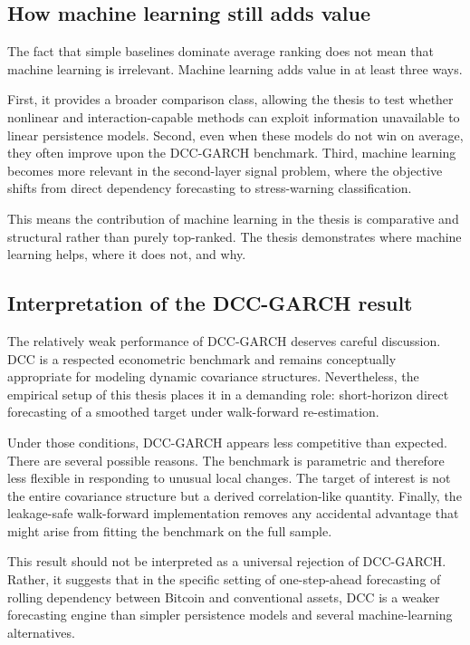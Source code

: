 \subsection{How machine learning still adds value}

The fact that simple baselines dominate average ranking does not mean that machine learning is irrelevant. Machine learning adds value in at least three ways.

First, it provides a broader comparison class, allowing the thesis to test whether nonlinear and interaction-capable methods can exploit information unavailable to linear persistence models. Second, even when these models do not win on average, they often improve upon the DCC-GARCH benchmark. Third, machine learning becomes more relevant in the second-layer signal problem, where the objective shifts from direct dependency forecasting to stress-warning classification.

This means the contribution of machine learning in the thesis is comparative and structural rather than purely top-ranked. The thesis demonstrates where machine learning helps, where it does not, and why.

\subsection{Interpretation of the DCC-GARCH result}

The relatively weak performance of DCC-GARCH deserves careful discussion. DCC is a respected econometric benchmark and remains conceptually appropriate for modeling dynamic covariance structures. Nevertheless, the empirical setup of this thesis places it in a demanding role: short-horizon direct forecasting of a smoothed target under walk-forward re-estimation.

Under those conditions, DCC-GARCH appears less competitive than expected. There are several possible reasons. The benchmark is parametric and therefore less flexible in responding to unusual local changes. The target of interest is not the entire covariance structure but a derived correlation-like quantity. Finally, the leakage-safe walk-forward implementation removes any accidental advantage that might arise from fitting the benchmark on the full sample.

This result should not be interpreted as a universal rejection of DCC-GARCH. Rather, it suggests that in the specific setting of one-step-ahead forecasting of rolling dependency between Bitcoin and conventional assets, DCC is a weaker forecasting engine than simpler persistence models and several machine-learning alternatives.

